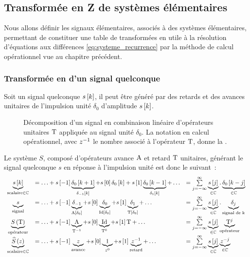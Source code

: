 \subsection{Transformée en Z de systèmes élémentaires}
\label{sec:transformee_en_z}
Nous allons définir les signaux élémentaires, associés à des systèmes
élémentaires, permettant de constituer une table de transformées en
\tZ{} utile à la résolution d'équations aux différences
\eqref{eq:systeme_recurrence} par la méthode de calcul opérationnel
vue au chapitre précédent.

\subsubsection{Transformée en \tZ{} d'un signal quelconque}

Soit un signal quelconque $s\left[k\right]$, il peut être généré par des
retards et des avances unitaires de l'impulsion unité $\delta_0$
d'amplitude $s\left[k\right]$.

\begin{figure}[ht!]
  \centering
  \caption{Décomposition d'un signal en combinaison linéaire
    d'opérateurs unitaires $\mathrm{T}$ appliquée au signal unité
    $\delta_0$. La notation en calcul opérationnel, avec $z^{-1}$ le
    nombre associé à l'opérateur $\mathrm{T}$, donne la \teZ.}
  \label{fig:decomposition_unite}
\end{figure}
Le système $S$, composé d'opérateurs avance
$\mathrm{A}$ et retard $\mathrm{T}$ unitaires, générant le signal quelconque
$s$ en réponse à l'impulsion unité est donc le suivant~:
\begin{equation}
  \label{eq:decomposition_unite}
  \begin{array}{cll}
    \underbrace{s\left[k\right]}_{\text{scalaire}\in\mathbb{C}} &= \ldots +  s\left[-1\right] \underbrace{\delta_0\left[k+1\right]}_{\delta_{-1}\left[k\right]} + s\left[0\right] \delta_0\left[k\right] + s\left[1\right] \underbrace{\delta_0\left[k-1\right]}_{\delta_1\left[k\right]} + \ldots &= \sum\limits_{j=-\infty}^{\infty}{\underbrace{s\left[j\right]}_{\in\mathbb{C}}.\underbrace{\delta_0\left[k-j\right]}_{\in\mathbb{C}}} \\
    \underbrace{s}_{\text{signal}} &= \ldots +  s\left[-1\right] \underbrace{\delta_{-1}}_{\mathrm{A}\left[\delta_0\right]} + s\left[0\right] \underbrace{\delta_0}_{\mathrm{Id}\left[\delta_0\right]} + s\left[1\right] \underbrace{\delta_{1}}_{\mathrm{T}\left[\delta_0\right]} +  \ldots &= \sum\limits_{j=-\infty}^{\infty}{\underbrace{s\left[j\right]}_{\in\mathbb{C}}.\underbrace{\delta_{j}}_{\text{signal de k}}} \\
    \underbrace{S\left(\mathrm{T}\right)}_{\text{opérateur}} &= \ldots + s\left[-1\right] \underbrace{\mathrm{A}}_{\mathrm{T}^{-1}} + s\left[0\right]
                                            \underbrace{\mathrm{Id}}_{\mathrm{T}^0} + s\left[1\right] \mathrm{T} + \ldots &= \sum\limits_{j=-\infty}^{\infty}{\underbrace{s\left[j\right]}_{\in\mathbb{C}}\underbrace{\mathrm{T}^{j}}_{\text{opérateur}}}\\
    \underbrace{\widehat{S}\left(z\right)}_{\text{scalaire}\in\mathbb{C}} &= \ldots + s\left[-1\right] \underbrace{z}_{\text{avance}} + s\left[0\right]
    \underbrace{1}_{z^0} + s\left[1\right] \underbrace{z^{-1}}_{\text{retard}}+ \ldots &= \sum\limits_{j=-\infty}^{\infty}{\underbrace{s\left[j\right]}_{\in\mathbb{C}}\underbrace{z^{-j}}_{\in\mathbb{C}}}   
  \end{array}
\end{equation}

